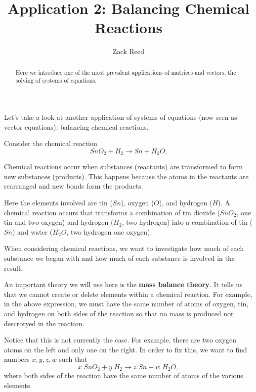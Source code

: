 \documentclass{ximera}
\author{Zack Reed} %
\title{Application 2: Balancing Chemical Reactions}
\begin{document}
\begin{abstract}
Here we introduce one of the most prevalent applications of matrices and vectors, the solving of systems of equations.
\end{abstract}
\maketitle

  Let's take a look at another application of systems of equations (now seen as vector equations): balancing chemical reactions.

  \begin{exploration}

 Consider
  the chemical reaction \begin{equation*}
    SnO_2+H_2\rightarrow Sn+H_2O.
  \end{equation*}

Chemical reactions occur when substances (reactants) are transformed to form new substances (products). This happens because the atoms in the reactants are rearranged and new bonds form the products. 

Here the elements involved are tin ($Sn$), oxygen ($O$), and hydrogen
($H$). A chemical reaction occurs that transforms a combination of tin
dioxide ($SnO_2$, one tin and two oxygen) and hydrogen ($H_2$, two hydrogen) into a combination of tin
($Sn$) and water ($H_2O$, two hydrogen one oxygen). 

When considering chemical reactions, we
want to investigate how much of each substance we began with and how
much of each substance is involved in the result.

An important theory we will use here is the {\bf mass balance theory}. It
tells us that we cannot create or delete elements within a chemical
reaction. For example, in the above expression, we must have the same
number of atoms of oxygen, tin, and hydrogen on both sides of the
reaction so that no mass is produced nor descrotyed in the reaction. 

Notice that this is not currently the case.  For example,
there are two oxygen atoms on the left and only one on the right. In
order to fix this, we want to find numbers $x,y,z,w$ such that
\begin{equation*}
  x\;SnO_2+y\;H_2\rightarrow z\;Sn+w\;H_2O,
\end{equation*}
where both sides of the reaction have the same number of atoms of the
various elements.


\end{exploration}
\end{document}
